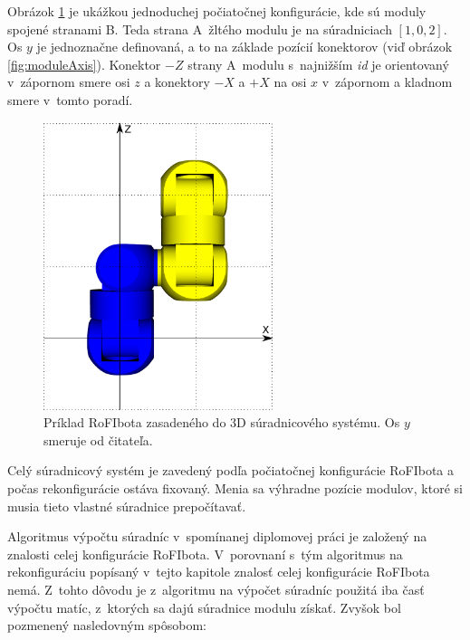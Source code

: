 \documentclass[
  printed, %
  oneside, %
  notable,   %
  nolof,     %
  nolot,     %
]{fithesis3}
\begin{document}
Obrázok \ref{fig:moduleCoordinates} je ukážkou jednoduchej počiatočnej konfigurácie, kde sú moduly spojené stranami B. Teda strana A~žltého modulu je na súradniciach $[1, 0, 2]$. Os $y$ je jednoznačne definovaná, a to na základe pozícií konektorov (viď obrázok \ref{fig:moduleAxis}). Konektor $-Z$ strany A~modulu s~najnižším \textit{id} je orientovaný v~zápornom smere osi $z$ a konektory $-X$ a $+X$ na osi $x$ v~zápornom a kladnom smere v~tomto poradí. 

\begin{figure}[hbt!]
    \centering
    \includegraphics[width=0.6\textwidth]{pictures/module_coordinates.pdf}
    \caption[Ukážka súradnicového systému]{Príklad RoFIbota zasadeného do 3D súradnicového systému. Os $y$ smeruje od čitateľa. }
    \label{fig:moduleCoordinates}
\end{figure}

Celý súradnicový systém je zavedený podľa počiatočnej konfigurácie RoFIbota a počas rekonfigurácie ostáva fixovaný. Menia sa výhradne pozície modulov, ktoré si musia tieto vlastné súradnice prepočítavať. 

Algoritmus výpočtu súradníc v~spomínanej diplomovej práci je založený na znalosti celej konfigurácie RoFIbota. V~porovnaní s~tým algoritmus na rekonfiguráciu popísaný v~tejto kapitole znalosť celej konfigurácie RoFIbota nemá. Z~tohto dôvodu je z~algoritmu na výpočet súradníc použitá iba časť výpočtu matíc, z~ktorých sa dajú súradnice modulu získať. Zvyšok bol pozmenený nasledovným spôsobom: 
\end{document}

